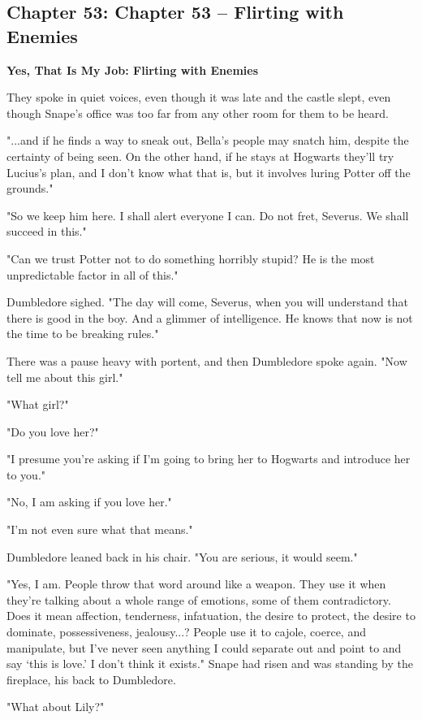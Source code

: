 \documentclass[a4paper,11pt]{article}
\begin{document}
\subsection{Chapter 53: Chapter 53 – Flirting with Enemies}

\textbf{Yes, That Is My Job: Flirting with Enemies}

They spoke in quiet voices, even though it was late and the castle slept, even though Snape's office was too far from any other room for them to be heard.

"...and if he finds a way to sneak out, Bella's people may snatch him, despite the certainty of being seen. On the other hand, if he stays at Hogwarts they'll try Lucius's plan, and I don't know what that is, but it involves luring Potter off the grounds."

"So we keep him here. I shall alert everyone I can. Do not fret, Severus. We shall succeed in this."

"Can we trust Potter not to do something horribly stupid? He is the most unpredictable factor in all of this."

Dumbledore sighed. "The day will come, Severus, when you will understand that there is good in the boy. And a glimmer of intelligence. He knows that now is not the time to be breaking rules."

There was a pause heavy with portent, and then Dumbledore spoke again. "Now tell me about this girl."

"What girl?"

"Do you love her?"

"I presume you're asking if I'm going to bring her to Hogwarts and introduce her to you."

"No, I am asking if you love her."

"I'm not even sure what that means."

Dumbledore leaned back in his chair. "You are serious, it would seem."

"Yes, I am. People throw that word around like a weapon. They use it when they're talking about a whole range of emotions, some of them contradictory. Does it mean affection, tenderness, infatuation, the desire to protect, the desire to dominate, possessiveness, jealousy...? People use it to cajole, coerce, and manipulate, but I've never seen anything I could separate out and point to and say `this is love.' I don't think it exists." Snape had risen and was standing by the fireplace, his back to Dumbledore.

"What about Lily?"
\end{document}
